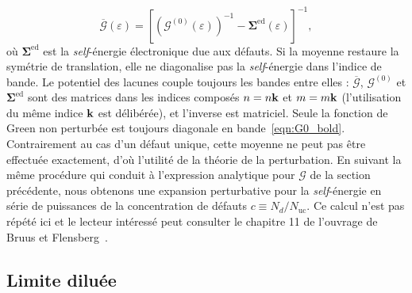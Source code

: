 \begin{equation}
    \overline{\bm{\mathcal{G}}}(\varepsilon) = \left[\left(\bm{\mathcal{G}}^{(0)}(\varepsilon)\right)^{-1}-\bm{\Sigma}^\text{ed}(\varepsilon)\right]^{-1},\label{eqn:G_moyenne}
\end{equation}
où $\bm{\Sigma}^\text{ed}$ est la \textit{self}-énergie électronique due aux défauts. Si la moyenne restaure la symétrie de translation, elle ne diagonalise pas la \textit{self}-énergie dans l'indice de bande. Le potentiel des lacunes couple toujours les bandes entre elles : $\overline{\bm{\mathcal{G}}}$, $\bm{\mathcal{G}}^{(0)}$ et $\bm{\Sigma}^\text{ed}$ sont des matrices dans les indices composés $n= n\mathbf{k}$ et $m=m\mathbf{k}$ (l'utilisation du même indice $\mathbf{k}$ est délibérée), et l'inverse est matriciel. Seule la fonction de Green non perturbée est toujours diagonale en bande~\eqref{eqn:G0_bold}. Contrairement au cas d'un défaut unique, cette moyenne ne peut pas être effectuée exactement, d'où l'utilité de la théorie de la perturbation. En suivant la même procédure qui conduit à l'expression analytique pour $\mathcal{G}$ de la section précédente, nous obtenons une expansion perturbative pour la \textit{self}-énergie en série de puissances de la concentration de défauts $c\equiv N_d/N_\text{uc}$. Ce calcul n'est pas répété ici et le lecteur intéressé peut consulter le chapitre 11 de l'ouvrage de Bruus et Flensberg~\cite{bruusManyBodyQuantumTheory2004}.

\subsection{Limite diluée}

